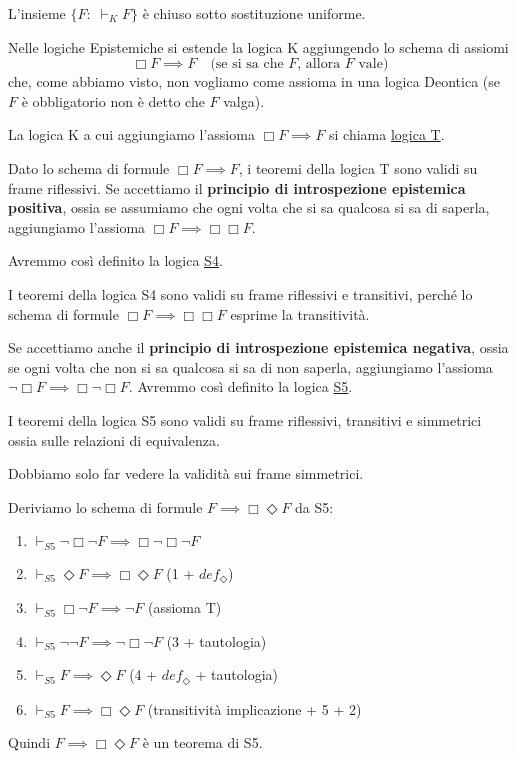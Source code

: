 \documentclass[../main.tex]{subfiles}
\begin{document}
\begin{theorem}
    L'insieme $\{F : \; \vdash_K F\}$ è chiuso sotto sostituzione uniforme.
\end{theorem}

Nelle logiche Epistemiche si estende la logica K aggiungendo lo schema di assiomi
\begin{equation*}
    \Box F \implies F \quad \text{(se si sa che $F$, allora $F$ vale)}
\end{equation*}
che, come abbiamo visto, non vogliamo come assioma in una logica Deontica (se $F$ è obbligatorio non è detto che $F$ valga).

La logica K a cui aggiungiamo l'assioma $\Box F \implies F$ si chiama \underline{logica T}.

Dato lo schema di formule $\Box F \implies F$, i teoremi della logica T sono validi su frame riflessivi.
Se accettiamo il \textbf{principio di introspezione epistemica positiva}, ossia se assumiamo che ogni volta che si sa qualcosa si sa di saperla, aggiungiamo l'assioma $\Box F \implies \Box \Box F$.

Avremmo così definito la logica \underline{S4}.

I teoremi della logica S4 sono validi su frame riflessivi e transitivi, perché lo schema di formule $\Box F \implies \Box \Box F$ esprime la transitività.

Se accettiamo anche il \textbf{principio di introspezione epistemica negativa}, ossia se ogni volta che non si sa qualcosa si sa di non saperla, aggiungiamo l'assioma $\neg \Box F \implies \Box \neg \Box F$.
Avremmo così definito la logica \underline{S5}.

I teoremi della logica S5 sono validi su frame riflessivi, transitivi e simmetrici ossia sulle relazioni di equivalenza.

Dobbiamo solo far vedere la validità sui frame simmetrici.

Deriviamo lo schema di formule $F \implies \Box \Diamond F$ da S5:
\begin{enumerate}[label=\arabic*)]
    \item $\vdash_{S5} \neg \Box \neg F \implies \Box \neg \Box \neg F$
    \item $\vdash_{S5} \Diamond F \implies \Box \Diamond F$ (1 + $def_\Diamond$)
    \item $\vdash_{S5} \Box \neg F \implies \neg F$ (assioma T)
    \item $\vdash_{S5} \neg \neg F \implies \neg \Box \neg F$ (3 + tautologia)
    \item $\vdash_{S5} F \implies \Diamond F$ (4 + $def_\Diamond$ + tautologia)
    \item $\vdash_{S5} F \implies \Box \Diamond F$ (transitività implicazione + 5 + 2)
\end{enumerate}
Quindi $F \implies \Box \Diamond F$ è un teorema di S5.
\end{document}
